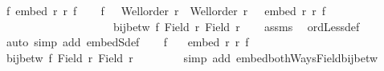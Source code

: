 \begin{isabellebody}
\ {\isachardoublequoteopen}{\isasymnot}{\isacharparenleft}{\kern0pt}{\isasymexists}f{\isacharprime}{\kern0pt}{\isachardot}{\kern0pt}\ embed\ r{\isacharprime}{\kern0pt}\ r\ f{\isacharprime}{\kern0pt}{\isacharparenright}{\kern0pt}{\isachardoublequoteclose}\isanewline
%
\isadelimproof
%
\endisadelimproof
%
\isatagproof
{}\isamarkupfalse%
{\isacharminus}{\kern0pt}\isanewline
\ \ \isamarkupfalse%
\ f\ \ {}{\isacharcolon}{\kern0pt}\ {\isachardoublequoteopen}Well{\isacharunderscore}{\kern0pt}order\ r\ {\isasymand}\ Well{\isacharunderscore}{\kern0pt}order\ r{\isacharprime}{\kern0pt}{\isachardoublequoteclose}\ \ {}{\isacharcolon}{\kern0pt}\ {\isachardoublequoteopen}embed\ r\ r{\isacharprime}{\kern0pt}\ f{\isachardoublequoteclose}\ \isanewline
\ \ \ \ \ \ \ \ \ \ \ \ \ \ \ \ \ {}{\isacharcolon}{\kern0pt}\ {\isachardoublequoteopen}\ {\isasymnot}\ bij{\isacharunderscore}{\kern0pt}betw\ f\ {\isacharparenleft}{\kern0pt}Field\ r{\isacharparenright}{\kern0pt}\ {\isacharparenleft}{\kern0pt}Field\ r{\isacharprime}{\kern0pt}{\isacharparenright}{\kern0pt}{\isachardoublequoteclose}\isanewline
\ \ \isamarkupfalse%
\ assms\ \isamarkupfalse%
\ ordLess{\isacharunderscore}{\kern0pt}def\ \isamarkupfalse%
\ {\isacharparenleft}{\kern0pt}auto\ simp\ add{\isacharcolon}{\kern0pt}\ embedS{\isacharunderscore}{\kern0pt}def{\isacharparenright}{\kern0pt}\isanewline
\ \ \isacommand{{\isacharbraceleft}{\kern0pt}}\isamarkupfalse%
\isamarkupfalse%
\ f{\isacharprime}{\kern0pt}\ \isamarkupfalse%
\ {\isacharasterisk}{\kern0pt}{\isacharcolon}{\kern0pt}\ {\isachardoublequoteopen}embed\ r{\isacharprime}{\kern0pt}\ r\ f{\isacharprime}{\kern0pt}{\isachardoublequoteclose}\isanewline
\ \ \ \isamarkupfalse%
\ {\isachardoublequoteopen}bij{\isacharunderscore}{\kern0pt}betw\ f\ {\isacharparenleft}{\kern0pt}Field\ r{\isacharparenright}{\kern0pt}\ {\isacharparenleft}{\kern0pt}Field\ r{\isacharprime}{\kern0pt}{\isacharparenright}{\kern0pt}{\isachardoublequoteclose}\ \isamarkupfalse%
\ {}\ {}\isanewline
\ \ \ \isamarkupfalse%
\ {\isacharparenleft}{\kern0pt}simp\ add{\isacharcolon}{\kern0pt}\ embed{\isacharunderscore}{\kern0pt}bothWays{\isacharunderscore}{\kern0pt}Field{\isacharunderscore}{\kern0pt}bij{\isacharunderscore}{\kern0pt}betw{\isacharparenright}{\kern0pt}\isanewline
\ \ \ \isamarkupfalse%

\end{isabellebody}
